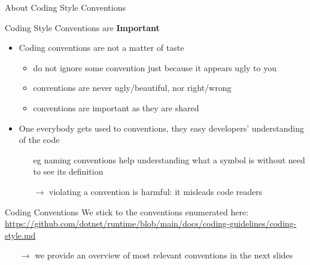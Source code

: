 \documentclass[presentation]{beamer}
\begin{document}
\begin{frame}[allowframebreaks]{About Coding Style Conventions}
\begin{alertblock}{Coding Style Conventions are \textbf{Important}}
\begin{itemize}
            \item Coding conventions are \alert{not} a matter of \alert{taste}
            \begin{itemize}
                \item \alert{do not ignore} some convention just because it appears \alert{ugly} to you
                \item conventions are never ugly/beautiful, nor right/wrong
                \item conventions are important as they are \alert{shared}
            \end{itemize} 

            \item One everybody gets used to conventions, they easy developers' understanding of the code
            \begin{itemize}
                \item[eg] naming conventions help understanding what a symbol is without need to see its definition
                \item[$\rightarrow$] violating a convention is harmful: it misleads code readers  
            \end{itemize}
        \end{itemize}
    \end{alertblock}

    \begin{exampleblock}{\csharp Coding Conventions}\centering
        We stick to the conventions enumerated here:
        \\
        {\tiny \url{https://github.com/dotnet/runtime/blob/main/docs/coding-guidelines/coding-style.md}}
    \end{exampleblock}
    \begin{itemize}
        \item[$\rightarrow$] we provide an overview of most relevant conventions in the next slides 
    \end{itemize}
\end{frame}
\end{document}
